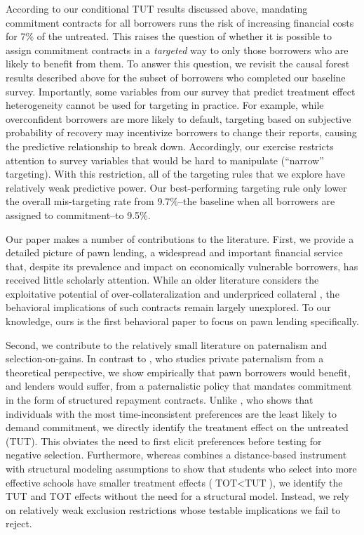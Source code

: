 \documentclass[12pt, a4paper]{article}
\begin{document}
According to our conditional TUT results discussed above, mandating commitment contracts for all borrowers runs the risk of increasing financial costs for 7\% of the untreated. This raises the question of whether it is possible to assign commitment contracts in a \emph{targeted} way to only those borrowers who are likely to benefit from them. To answer this question, we revisit the causal forest results described above for the subset of borrowers who completed our baseline survey. Importantly, some variables from our survey that predict treatment effect heterogeneity cannot be used for targeting in practice. For example, while overconfident borrowers are more likely to default, targeting based on subjective probability of recovery may incentivize borrowers to change their reports, causing the predictive relationship to break down. Accordingly, our exercise restricts attention to survey variables that would be hard to manipulate (``narrow'' targeting). With this restriction, all of the targeting rules that we explore have relatively weak predictive power. Our best-performing targeting rule only lower the overall mis-targeting rate from 9.7\%--the baseline when all borrowers are assigned to commitment--to 9.5\%.

Our paper makes a number of contributions to the literature. First, we provide a detailed picture of pawn lending, a widespread and important financial service that, despite its prevalence and impact on economically vulnerable borrowers, has received little scholarly attention. While an older literature considers the exploitative potential of over-collateralization and underpriced collateral \citep{basu1984implicit}, the behavioral implications of such contracts remain largely unexplored. To our knowledge, ours is the first behavioral paper to focus on pawn lending specifically.

Second, we contribute to the relatively small literature on paternalism and selection-on-gains. In contrast to \cite{Laibson2018}, who studies private paternalism from a theoretical perspective, we show empirically that pawn borrowers would benefit, and lenders would suffer, from a paternalistic policy that mandates commitment in the form of structured repayment contracts. Unlike \cite{Sprenger}, who shows that individuals with the most time-inconsistent preferences are the least likely to demand commitment, we directly identify the treatment effect on the untreated (TUT). This obviates the need to first elicit preferences before testing for negative selection. Furthermore, whereas \cite{Walters} combines a distance-based instrument with structural modeling assumptions to show that students who select into more effective schools have smaller treatment effects ($\text{TOT} < \text{TUT}$), we identify the TUT and TOT effects without the need for a structural model. Instead, we rely on relatively weak exclusion restrictions whose testable implications we fail to reject.
\end{document}
